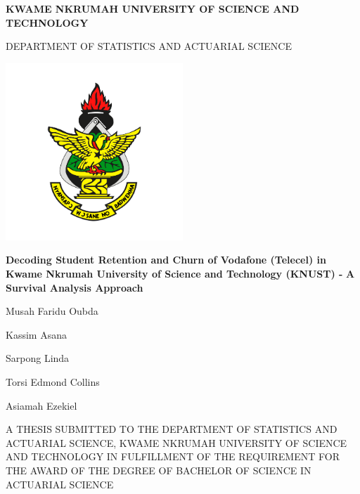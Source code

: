 \documentclass[12pt]{report} %
\begin{document}
\begin{titlepage}
\centering
    \vspace{0.2cm}
    \Large\textbf{KWAME NKRUMAH UNIVERSITY OF SCIENCE AND TECHNOLOGY}
    
      \vspace{0.2cm}
   \large{DEPARTMENT OF STATISTICS AND ACTUARIAL SCIENCE}
    \vspace{0.4cm}
    
     \begin{center}
\includegraphics[width=0.5\textwidth]{logo.png}\end{center}

    \large{\textbf{Decoding Student Retention and Churn of
Vodafone (Telecel) in Kwame Nkrumah University
of Science and Technology (KNUST) - }}
\vspace{0.2cm}
   \large{\textbf{A Survival Analysis Approach}}
    \vspace{0.4cm}
    
\large{Musah Faridu Oubda

Kassim Asana

Sarpong Linda

Torsi Edmond Collins

Asiamah Ezekiel}

    \vspace{0.8cm}  
    \small{A THESIS SUBMITTED TO THE DEPARTMENT OF STATISTICS AND ACTUARIAL SCIENCE, KWAME NKRUMAH UNIVERSITY OF SCIENCE AND TECHNOLOGY IN FULFILLMENT OF THE REQUIREMENT FOR THE AWARD OF THE DEGREE OF BACHELOR OF SCIENCE IN ACTUARIAL SCIENCE}\\


\end{titlepage}

\end{document}
